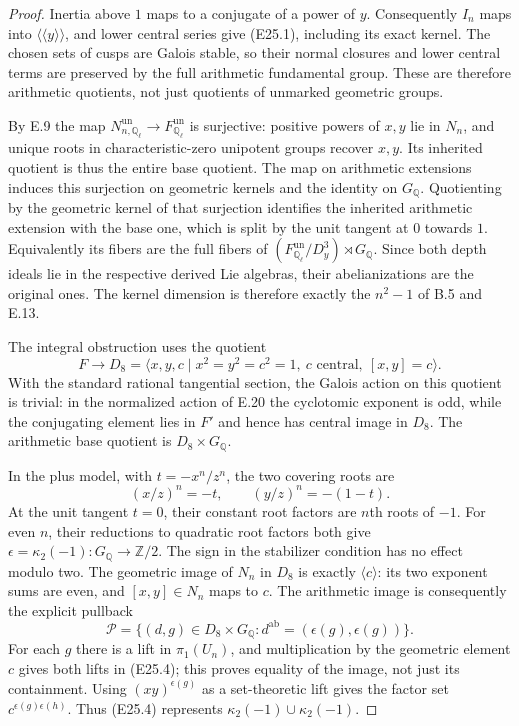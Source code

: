 \begin{proof}
Inertia above $1$ maps to a conjugate of a power of $y$.
Consequently $I_n$ maps into $\langle\!\langle y\rangle\!\rangle$,
and lower central series give (E25.1), including its exact kernel.
The chosen sets of cusps are Galois stable, so their normal
closures and lower central terms are preserved by the full
arithmetic fundamental group. These are therefore arithmetic
quotients, not just quotients of unmarked geometric groups.

By E.9 the map
$N_{n,\mathbb Q_\ell}^{\mathrm{un}}\to
 F_{\mathbb Q_\ell}^{\mathrm{un}}$ is surjective: positive powers
of $x,y$ lie in $N_n$, and unique roots in characteristic-zero
unipotent groups recover $x,y$. Its inherited quotient is thus
the entire base quotient. The map on arithmetic extensions
induces this surjection on geometric kernels and the identity
on $G_{\mathbb Q}$. Quotienting by the geometric kernel of that
surjection identifies the inherited arithmetic extension with
the base one, which is split by the unit tangent at $0$ towards
$1$. Equivalently its fibers are the full fibers of
$(F_{\mathbb Q_\ell}^{\mathrm{un}}/D_y^3)\rtimes G_{\mathbb Q}$.
Since both depth ideals lie in the respective derived Lie
algebras, their abelianizations are the original ones.
The kernel dimension is therefore exactly the $n^2-1$ of B.5
and E.13.

The integral obstruction uses the quotient
\[
 F\longrightarrow
 D_8=\langle x,y,c\mid
   x^2=y^2=c^2=1,\ c\text{ central},\ [x,y]=c\rangle .
 \tag{E25.2}
\]
With the standard rational tangential section, the Galois action
on this quotient is trivial: in the normalized action of E.20
the cyclotomic exponent is odd, while the conjugating element
lies in $F'$ and hence has central image in $D_8$.
The arithmetic base quotient is $D_8\times G_{\mathbb Q}$.

In the plus model, with $t=-x^n/z^n$, the two covering roots are
\[
 (x/z)^n=-t,\qquad(y/z)^n=-(1-t).
 \tag{E25.3}
\]
At the unit tangent $t=0$, their constant root factors are
$n$th roots of $-1$. For even $n$, their reductions to quadratic
root factors both give
$\epsilon=\kappa_2(-1):G_{\mathbb Q}\to\mathbb Z/2$.
The sign in the stabilizer condition has no effect modulo two.
The geometric image of $N_n$ in $D_8$ is exactly
$\langle c\rangle$: its two exponent sums are even, and
$[x,y]\in N_n$ maps to $c$. The arithmetic image is consequently
the explicit pullback
\[
 \mathcal P=
 \{(d,g)\in D_8\times G_{\mathbb Q}:
           d^{\mathrm{ab}}=(\epsilon(g),\epsilon(g))\}.
 \tag{E25.4}
\]
For each $g$ there is a lift in $\pi_1(U_n)$, and multiplication
by the geometric element $c$ gives both lifts in (E25.4);
this proves equality of the image, not just its containment.
Using $(xy)^{\epsilon(g)}$ as a set-theoretic lift gives the
factor set $c^{\epsilon(g)\epsilon(h)}$.
Thus (E25.4) represents
$\kappa_2(-1)\cup\kappa_2(-1)$.


\end{proof}
